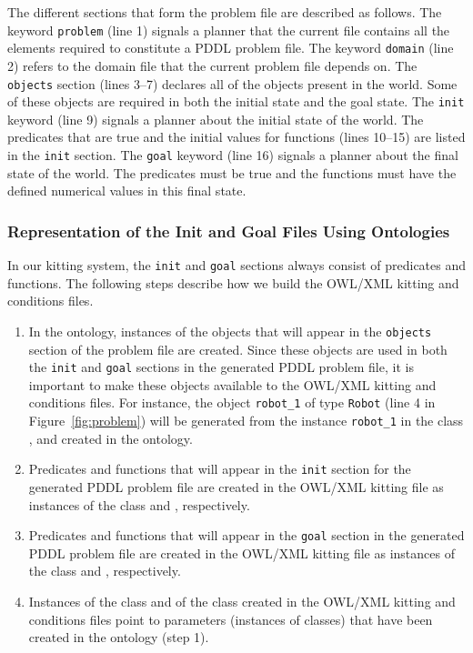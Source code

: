 The different sections that form the problem file are described as follows. The keyword
\texttt{problem} (line 1) signals a planner that the current file contains all the elements
required to constitute a PDDL problem file. The keyword \texttt{domain} (line 2) refers to
the domain file that the current problem file depends on. The \texttt{objects} section (lines 3--7)
declares all of the objects present in the world. Some of these objects are required in both the
initial state and the goal state. The \texttt{init} keyword (line 9) signals a planner about
the initial state of the world. The predicates that are true and the initial values for
functions (lines 10--15) are listed in the \texttt{init} section. The \texttt{goal} keyword
(line 16) signals a planner about the final state of the world. The predicates must be true
and the functions must have the defined numerical values in this final state.


\subsubsection{Representation of the Init and Goal Files Using Ontologies}
In our kitting system, the \texttt{init} and \texttt{goal} sections always consist of
predicates and functions. The following steps describe how we build the OWL/XML kitting
 and  conditions files.
\begin{enumerate}
 \item In the  ontology, instances of the objects that will appear in the
\texttt{objects} section of the problem file are created. Since these objects are used
in both the \texttt{init} and \texttt{goal} sections in the generated PDDL problem file,
it is important to make these objects available to the OWL/XML kitting  and
 conditions files. For instance, the object \texttt{robot\_1} of type
\texttt{Robot} (line 4 in Figure~\ref{fig:problem}) will be generated from the instance
\texttt{robot\_1} in the class , and created in the  ontology.
 \item Predicates and functions that will appear in the \texttt{init} section for the
generated PDDL problem file are created in the OWL/XML kitting  file as instances
of the class  and , respectively.
 \item Predicates and functions that will appear in the \texttt{goal} section in the
generated PDDL problem file are created in the OWL/XML kitting  file as
instances of the class  and , respectively.
 \item Instances of the class  and of the class 
created in the OWL/XML kitting  and  conditions files point to parameters (instances of classes) that have been created in the  ontology (step 1).
\end{enumerate}


